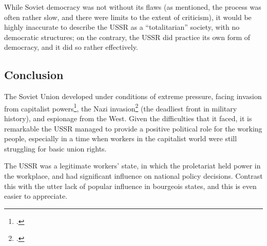 While Soviet democracy was not without its flaws (as mentioned, the
process was often rather slow, and there were limits to the extent of
criticism), it would be highly inaccurate to describe the USSR as a
``totalitarian'' society, with no democratic structures; on the
contrary, the USSR did practice its own form of democracy, and it did so
rather effectively.

\subsection*{Conclusion}

The Soviet Union developed under conditions of extreme pressure, facing
invasion from capitalist powers\footcite{wikiamerican}, the Nazi
invasion\footcite{wikieastern}
(the deadliest front in military history), and espionage from the West.
Given the difficulties that it faced, it is remarkable the USSR managed
to provide a positive political role for the working people, especially
in a time when workers in the capitalist world were still struggling for
basic union rights.

The USSR was a legitimate workers' state, in which the proletariat held
power in the workplace, and had significant influence on national policy
decisions. Contrast this with the utter lack of popular influence in
bourgeois states, and this is even easier to appreciate.
